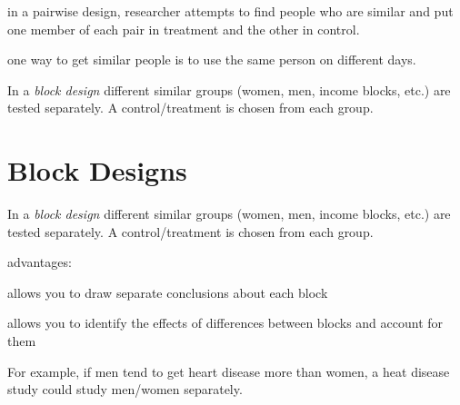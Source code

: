 \documentclass[landscape]{exam}
\begin{document}
  \begin{itemize*}
    \item in a pairwise design, researcher attempts to find people who are
      similar and put one member of each pair in treatment and the other in
      control.

    \item one way to get similar people is to use the same person on different
      days.

    \item In a {\em block design\/} different similar groups (women, men, income
      blocks, etc.) are tested separately.  A control/treatment is chosen from
      each group.  
  \end{itemize*}

  \section{Block Designs}
    In a {\em block design\/} different similar groups (women, men, income blocks,
    etc.) are tested separately.  A control/treatment is chosen from each group.  

    advantages:
    \begin{itemize*}
      \item allows you to draw separate conclusions about each block
      \item allows you to identify the effects of differences between blocks and
        account for them
    \end{itemize*}

    For example, if men tend to get heart disease more than women, a heat
    disease study could study men/women separately.
\end{document}
